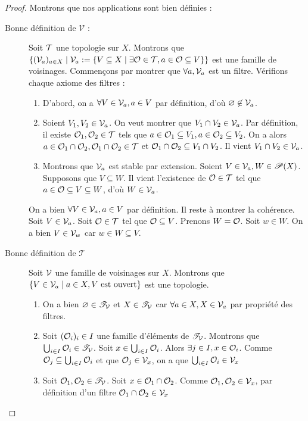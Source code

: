 \begin{proof}
Montrons que nos applications sont bien définies :
    \begin{description}
        \item[Bonne définition de $\mathscr{V}$ :] 
        Soit $\mathcal{T}$ une topologie sur $X$. Montrons que $\{(\mathcal{V}_a)_{a\in X}\mid \mathcal{V}_a := \{V\subseteq X\mid \exists \mathcal{O}\in \mathcal{T}, a\in \mathcal{O}\subseteq V\}\}$ est une famille de voisinages. Commençons par montrer que $\forall a, \mathcal{V}_a$ est un filtre. Vérifions chaque axiome des filtres :\begin{enumerate}
            \item D'abord, on a $\forall V\in\mathcal{V}_a, a\in V$ par définition, d'où $\varnothing\not\in\mathcal{V}_a$. 
            \item Soient $V_1,V_2\in\mathcal{V}_a$. On veut montrer que $V_1\cap V_2\in\mathcal{V}_a$. Par définition, il existe $\mathcal{O}_1,\mathcal{O}_2\in\mathcal{T}$ tels que $a\in\mathcal{O}_1\subseteq V_1,a\in \mathcal{O}_2\subseteq V_2$. On a alors $a\in\mathcal{O}_1\cap\mathcal{O}_2,\mathcal{O}_1\cap\mathcal{O}_2\in\mathcal{T}$ et $\mathcal{O}_1\cap\mathcal{O}_2\subseteq V_1\cap V_2$. Il vient $V_1\cap V_2\in\mathcal{V}_a$.
            \item Montrons que $\mathcal{V}_a$ est stable par extension. Soient $V\in\mathcal{V}_a,W\in\mathscr{P}(X)$. Supposons que $V\subseteq W$. Il vient l'existence de $\mathcal{O}\in\mathcal{T}$ tel que $a\in\mathcal{O}\subseteq V\subseteq W$, d'où $W\in\mathcal{V}_a$.
        \end{enumerate}
        On a bien $\forall V\in\mathcal{V}_a, a\in V$ par définition. Il reste à montrer la cohérence. Soit $V\in\mathcal{V}_a$. Soit $\mathcal{O}\in\mathcal{T}$ tel que $\mathcal{O} \subseteq V$. Prenons $W=\mathcal{O}$. Soit $w\in W$. On a bien $V\in\mathcal{V}_w$ car $w\in W\subseteq V$.
        \item[Bonne définition de $\mathscr{T}$] Soit $\mathcal{V}$ une famille de voisinages sur $X$. Montrons que $\{V\in\mathcal{V}_a\mid a\in X, V \text{ est ouvert}\}$ est une topologie.
        \begin{enumerate}
            \item On a bien $\varnothing\in\mathscr T_{\mathcal{V}}$ et $X\in\mathscr{T}_{\mathcal{V}}$ car $\forall a \in X,X\in\mathcal{V}_a$ par propriété des filtres.
            \item Soit $(\mathcal{O}_i)_i\in I$ une famille d'éléments de $\mathscr{T}_{\mathcal{V}}$. Montrons que $\bigcup_{i\in I}\mathcal{O}_i\in\mathscr{T}_{\mathcal{V}}$. Soit $x\in\bigcup_{i\in I}\mathcal{O}_i$. Alors $\exists j\in I, x\in\mathcal{O}_i$. Comme $\mathcal{O}_j\subseteq\bigcup_{i\in I}\mathcal{O}_i$ et que $\mathcal{O}_j\in\mathcal{V}_x$, on a que $\bigcup_{i\in I}\mathcal{O}_i\in\mathcal{V}_x$
            \item Soit $\mathcal{O}_1,\mathcal{O}_2\in\mathscr T_{\mathcal{V}}$. Soit $x\in \mathcal{O}_1\cap\mathcal{O}_2$. Comme $\mathcal{O}_1,\mathcal{O}_2\in\mathcal{V}_x$, par définition d'un filtre $\mathcal{O}_1\cap\mathcal{O}_2\in\mathcal{V}_x$
        \end{enumerate}
    \end{description}
\end{proof}
